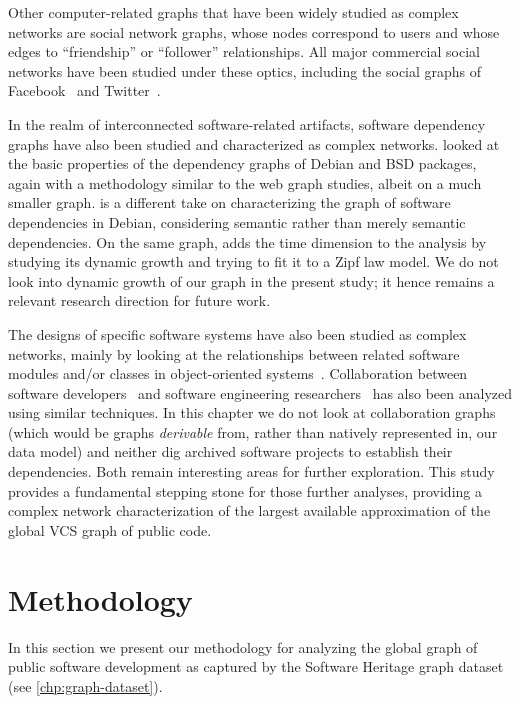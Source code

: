 Other computer-related graphs that have been widely studied as complex networks
are social network graphs, whose nodes correspond to users and whose edges to
``friendship'' or ``follower'' relationships. All major commercial social
networks have been studied under these optics, including the social graphs of
Facebook~\cite{ugander2011facebook} and Twitter~\cite{myers2014twitter}.

In the realm of interconnected software-related artifacts, software dependency
graphs have also been studied and characterized as complex networks.
\Textcite{labelle2004inter} looked at the basic properties of the dependency
graphs of Debian and BSD packages, again with a methodology similar to the web
graph studies, albeit on a much smaller graph. \Textcite{abate2009strong} is a
different take on characterizing the graph of software dependencies in Debian,
considering semantic rather than merely semantic dependencies. On the same
graph, \textcite{maillart2008empirical} adds the time dimension to the analysis
by studying its dynamic growth and trying to fit it to a Zipf law model. We do
not look into dynamic growth of our graph in the present study; it hence
remains a relevant research direction for future work.

The designs of specific software systems have also been studied as complex
networks, mainly by looking at the relationships between related software
modules and/or classes in object-oriented systems~\cite{myers2003software,
  valverde2003hierarchical, wen2007javanetwork}.  Collaboration between
software developers~\cite{singh2010smallworldcollab} and software engineering
researchers~\cite{hassan2004revengsmallworld} has also been analyzed using
similar techniques. In this chapter we do not look at collaboration graphs (which
would be graphs \emph{derivable} from, rather than natively represented in, our
data model) and neither dig archived software projects to establish their
dependencies. Both remain interesting areas for further exploration. This
study provides a fundamental stepping stone for those further analyses,
providing a complex network characterization of the largest available
approximation of the global VCS graph of public code.


\section{Methodology}%
\label{sec:topology-methodology}

In this section we present our methodology for analyzing the global graph of
public software development as captured by the Software Heritage graph dataset
(see \cref{chp:graph-dataset}).


